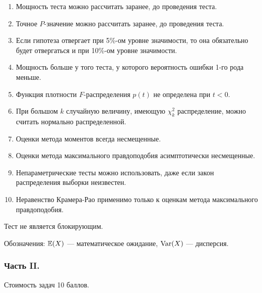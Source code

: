 \begin{enumerate}
\item Мощность теста можно рассчитать заранее, до проведения теста.
\item Точное $P$-значение можно рассчитать заранее, до проведения теста.
\item Если гипотеза отвергает при 5\%-ом уровне значимости, то
она обязательно будет отвергаться и при 10\%-ом уровне значимости.
\item Мощность больше у того теста, у которого вероятность ошибки
1-го рода меньше.
\item Функция плотности $F$-распределения $p(t)$ не определена при $t<0$.
\item При большом $k$ случайную величину, имеющую $\chi_{k}^{2}$ распределение, можно считать нормально распределенной.
\item Оценки метода моментов всегда несмещенные.
\item Оценки метода максимального правдоподобия асимптотически несмещенные.
\item Непараметрические тесты можно использовать, даже если закон распределения выборки неизвестен.
\item Неравенство Крамера-Рао применимо только к оценкам метода максимального правдоподобия.
\end{enumerate}

Тест не является блокирующим.

Обозначения: $\operatorname{\mathbb{E}}(X)$ — математическое ожидание, $\operatorname{Var}(X)$ — дисперсия.


\subsubsection*{Часть II.}

Стоимость задач 10 баллов.

